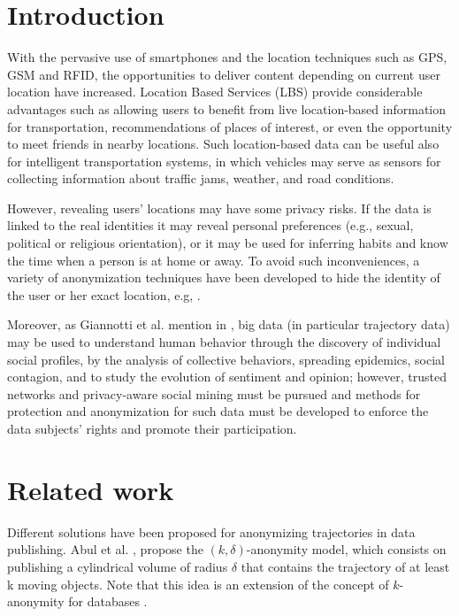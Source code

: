 \documentclass{llncs}
\begin{document}
\section{Introduction}

With the pervasive use of smartphones and the location techniques such as GPS, GSM and RFID, the opportunities to deliver content depending on current user location have increased.
Location Based Services (LBS) provide considerable advantages such as allowing users to benefit from live
location-based information for transportation, recommendations of places of interest, or even the opportunity to meet friends in nearby locations.
Such location-based data can be useful also for intelligent transportation systems, in which vehicles may serve as sensors for collecting information about traffic jams, weather, and road conditions.


However, revealing users' locations may have some privacy risks. If the data is linked to the real identities it may reveal personal preferences (e.g., sexual, political or religious orientation), or it may be used for inferring habits and know the time when a person is at home or away.
To avoid such inconveniences, a variety of anonymization techniques have been developed to hide the identity of the user or her exact location, e.g, \cite{Terrovitis:2011}.


Moreover, as Giannotti et al. mention in \cite{Giannotti2012}, big data (in particular trajectory data) may be used  to understand human behavior through the discovery of individual social profiles, by the analysis of collective behaviors, spreading epidemics, social contagion, and to study the evolution of sentiment and opinion; however, trusted networks and privacy-aware social mining must be pursued and methods for protection and anonymization for such data must be developed to enforce the data subjects' rights and promote their participation.

\section{Related work}
Different solutions have been proposed for anonymizing trajectories in data publishing. Abul et al. \cite{Abul2008}, propose the $(k, \delta)$-anonymity model, which consists on publishing a cylindrical volume of radius $\delta$ that contains the trajectory of at least k moving objects. Note that this idea is an extension of the concept of $k$-anonymity for databases \cite{Samarati:1998}.
\end{document}
